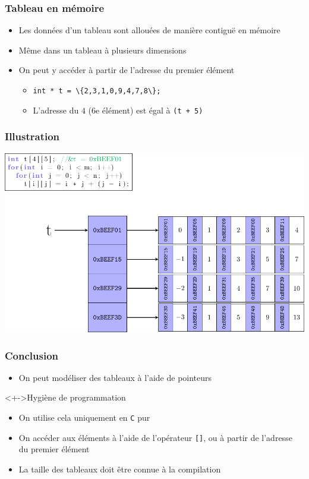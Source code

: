\begin{frame}
\frametitle{Tableau en mémoire}
\begin{itemize}[<+->]
\item Les données d'un tableau sont allouées de manière contiguë en mémoire
\item Même dans un tableau à plusieurs dimensions
\item On peut y accéder à partir de l'adresse du premier élément
	\begin{itemize}
	\item \lstinline|int * t = \{2,3,1,0,9,4,7,8\};|
	\item L'adresse du $4$ (6e élément) est égal à \lstinline|(t + 5)|
	\end{itemize}
\end{itemize}
\end{frame}

\begin{frame}
\frametitle{Illustration}
\begin{center}
\includegraphics[width=.9\textwidth]{pics/tab.pdf}
\end{center}
\end{frame}

\begin{frame}
\frametitle{Conclusion}
\begin{itemize}[<+->]
\item On peut modéliser des tableaux à l'aide de pointeurs
\end{itemize}
\begin{block}<+->{Hygiène de programmation}
	\begin{itemize}[<+->]
	\item On utilise cela uniquement en \texttt{C} pur
	\end{itemize}
\end{block}
\begin{itemize}[<+->]
\item On accéder aux éléments à l'aide de l'opérateur \texttt{[]}, ou à partir de l'adresse du premier élément
\item La taille des tableaux doit être connue à la compilation
\end{itemize}
\end{frame}

